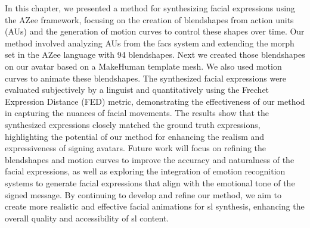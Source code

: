 \documentclass[../../main]{subfiles}
\begin{document}
In this chapter, we presented a method for synthesizing facial expressions using the AZee framework, focusing on the creation of blendshapes from action units (AUs) and the generation of motion curves to control these shapes over time. Our method involved analyzing AUs from the \gls{facs} system and extending the morph set in the AZee language with 94 blendshapes. Next we created those blendshapes on our avatar based on a MakeHuman template mesh. We also used motion curves to animate these blendshapes. The synthesized facial expressions were evaluated subjectively by a linguist and quantitatively using the Frechet Expression Distance (FED) metric, demonstrating the effectiveness of our method in capturing the nuances of facial movements. The results show that the synthesized expressions closely matched the ground truth expressions, highlighting the potential of our method for enhancing the realism and expressiveness of signing avatars. Future work will focus on refining the blendshapes and motion curves to improve the accuracy and naturalness of the facial expressions, as well as exploring the integration of emotion recognition systems to generate facial expressions that align with the emotional tone of the signed message. By continuing to develop and refine our method, we aim to create more realistic and effective facial animations for \gls{sl} synthesis, enhancing the overall quality and accessibility of \gls{sl} content.
\end{document}
